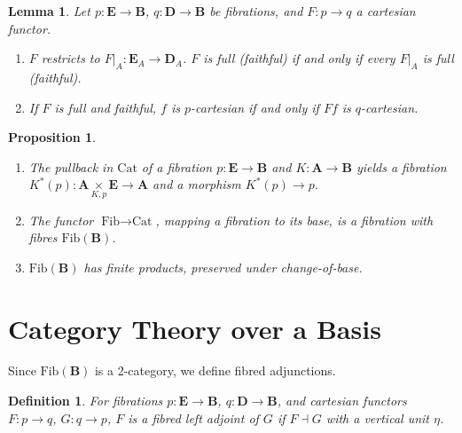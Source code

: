 \documentclass{article}
\theoremstyle{plain}
\newtheorem{lemma}[theorem]{Lemma}
\newtheorem{proposition}[theorem]{Proposition}
\newtheorem{definition}[theorem]{Definition}
\theoremstyle{remark}
\begin{document}
\begin{lemma}
\label{lem:2.5}
Let $p : \mathbf{E} \to \mathbf{B}$, $q : \mathbf{D} \to \mathbf{B}$ be fibrations, and $F : p \to q$ a cartesian functor.
\begin{enumerate}
    \item[(i)] $F$ restricts to $\left.F\right|_A : \mathbf{E}_A \to \mathbf{D}_A$. $F$ is full (faithful) if and only if every $\left.F\right|_A$ is full (faithful).
    \item[(ii)] If $F$ is full and faithful, $f$ is $p$-cartesian if and only if $F f$ is $q$-cartesian.
\end{enumerate}
\end{lemma}

\begin{proposition}
\label{prop:2.6}
\begin{enumerate}
    \item[(i)] The pullback in $\text{Cat}$ of a fibration $p : \mathbf{E} \to \mathbf{B}$ and $K : \mathbf{A} \to \mathbf{B}$ yields a fibration $K^*(p) : \mathbf{A} \underset{K, p}{\times} \mathbf{E} \to \mathbf{A}$ and a morphism $K^*(p) \to p$.
    \item[(ii)] The functor $\text{Fib} \to \text{Cat}$, mapping a fibration to its base, is a fibration with fibres $\text{Fib}(\mathbf{B})$.
    \item[(iii)] $\text{Fib}(\mathbf{B})$ has finite products, preserved under change-of-base.
\end{enumerate}
\end{proposition}

\newpage
\section{Category Theory over a Basis}
\label{sec:category-theory-basis}

Since $\text{Fib}(\mathbf{B})$ is a 2-category, we define fibred adjunctions.

\begin{definition}
\label{def:3.1}
For fibrations $p : \mathbf{E} \to \mathbf{B}$, $q : \mathbf{D} \to \mathbf{B}$, and cartesian functors $F : p \to q$, $G : q \to p$, $F$ is a \emph{fibred left adjoint} of $G$ if $F \dashv G$ with a vertical unit $\eta$.
\end{definition}
\end{document}
